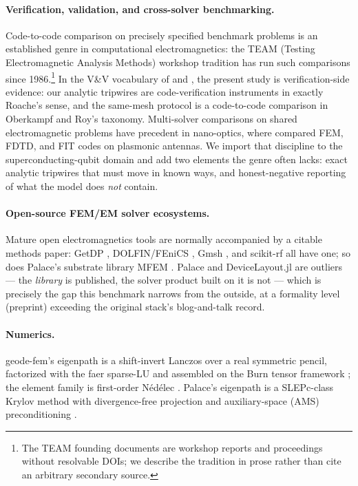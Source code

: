 \documentclass{anvil-paper}
\begin{document}
\paragraph{Verification, validation, and cross-solver benchmarking.}
Code-to-code comparison on precisely specified benchmark problems is an
established genre in computational electromagnetics: the TEAM (Testing
Electromagnetic Analysis Methods) workshop tradition has run such
comparisons since 1986.\footnote{The TEAM founding documents are workshop
reports and proceedings without resolvable DOIs; we describe the tradition
in prose rather than cite an arbitrary secondary source.} In the V\&V
vocabulary of \citet{roache1997quantification} and
\citet{oberkampf2010verification}, the present study is
verification-side evidence: our analytic tripwires are code-verification
instruments in exactly Roache's sense, and the same-mesh protocol is a
code-to-code comparison in Oberkampf and Roy's taxonomy. Multi-solver
comparisons on shared electromagnetic problems have precedent in
nano-optics, where \citet{hoffmann2009comparison} compared FEM, FDTD, and
FIT codes on plasmonic antennas. We import that discipline to the
superconducting-qubit domain and add two elements the genre often lacks:
exact analytic tripwires that must move in known ways, and honest-negative
reporting of what the model does \emph{not} contain.

\paragraph{Open-source FEM/EM solver ecosystems.}
Mature open electromagnetics tools are normally accompanied by a citable
methods paper: GetDP \citep{dular1998general}, DOLFIN/FEniCS
\citep{logg2010dolfin}, Gmsh \citep{gmsh}, and scikit-rf
\citep{arsenovic2022scikit} all have one; so does Palace's substrate
library MFEM \citep{mfem,andrej2024high}. Palace and DeviceLayout.jl are
outliers --- the \emph{library} is published, the solver product built on
it is not --- which is precisely the gap this benchmark narrows from the
outside, at a formality level (preprint) exceeding the original stack's
blog-and-talk record.

\paragraph{Numerics.}
geode-fem's eigenpath is a shift-invert Lanczos \citep{arpack} over a real
symmetric pencil, factorized with the faer sparse-LU \citep{kazdadi2026faer}
and assembled on the Burn tensor framework \citep{burn}; the element family
is first-order N\'ed\'elec \citep{nedelec1980}. Palace's eigenpath is a
SLEPc-class Krylov method \citep{slepc} with divergence-free projection and
auxiliary-space (AMS) preconditioning
\citep{hiptmair-xu,tzaniovkolevpanayotsvassilevski2018parallel}.
\end{document}
